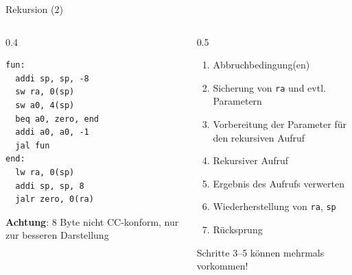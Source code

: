 \begin{frame}[c, fragile]{Rekursion (2)}{}
	\begin{columns}[c]
		\begin{column}{0.4\linewidth}
			\begin{lstlisting}
fun:
  addi sp, sp, -8
  sw ra, 0(sp)
  sw a0, 4(sp)
  beq a0, zero, end
  addi a0, a0, -1
  jal fun
end:
  lw ra, 0(sp)
  addi sp, sp, 8
  jalr zero, 0(ra)
      \end{lstlisting}
			\small \textbf{Achtung}: 8 Byte nicht CC-konform, nur zur besseren Darstellung
		\end{column}%
		\begin{column}{0.5\linewidth}

			\begin{enumerate}
				\item Abbruchbedingung(en)
				\item Sicherung von \verb|ra| und evtl. Parametern
				\item Vorbereitung der Parameter für den rekursiven Aufruf
				\item Rekursiver Aufruf
				\item Ergebnis des Aufrufs verwerten
				\item Wiederherstellung von \verb|ra|, \verb|sp|
				\item Rücksprung
			\end{enumerate}
			\vspace*{\baselineskip}
			Schritte 3--5 können mehrmals vorkommen!

			\vspace{0.85cm}
		\end{column}
	\end{columns}
\end{frame}


